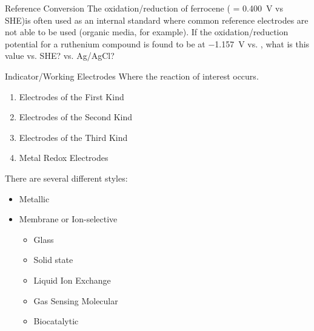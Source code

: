 \documentclass[notes=only]{beamer}
\begin{document}
\begin{frame}[t]{Reference Conversion}
	The oxidation/reduction of ferrocene ( =
	\SI{0.400}{\volt} vs SHE)\footnotemark is often used as an internal standard where
	common reference electrodes are not able to be used (organic media, for
	example). If the oxidation/reduction potential for a ruthenium compound
	is found to be at \SI{-1.157}{\volt} vs.
	, what
	is this value vs. SHE? vs. Ag/AgCl?

	\vfill


\end{frame}

\clearpage

\begin{frame}{Indicator/Working Electrodes}
	Where the reaction of interest occurs.

	\begin{enumerate}
		\item Electrodes of the First Kind
		\item Electrodes of the Second Kind
		\item Electrodes of the Third Kind
		\item Metal Redox Electrodes
	\end{enumerate}

	There are several different styles:
	\begin{itemize}
		\item Metallic
		\item Membrane or Ion-selective
			\begin{itemize}
				\item Glass
				\item Solid state
				\item Liquid Ion Exchange
				\item Gas Sensing Molecular
				\item Biocatalytic
			\end{itemize}
	\end{itemize}
\end{frame}
\end{document}
